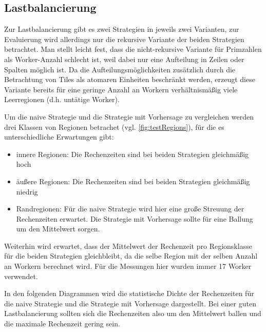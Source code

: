 \subsection{Lastbalancierung}\label{sec:lastbalancierung_eval}
Zur Lastbalancierung gibt es zwei Strategien in jeweils zwei Varianten, zur Evaluierung wird allerdings nur die rekursive Variante der beiden Strategien betrachtet.
Man stellt leicht fest, dass die nicht-rekursive Variante für Primzahlen als Worker-Anzahl schlecht ist, weil dabei nur eine Aufteilung in Zeilen oder Spalten möglich ist.
Da die Aufteilungsmöglichkeiten zusätzlich durch die Betrachtung von Tiles als atomaren Einheiten beschränkt werden, erzeugt diese Variante bereits für eine geringe Anzahl an Workern verhältnismäßig viele Leerregionen (d.h. untätige Worker).

Um die naive Strategie und die Strategie mit Vorhersage zu vergleichen werden drei Klassen von Regionen betrachet (vgl. \autoref{fig:testRegions}), für die es unterschiedliche Erwartungen gibt:

\begin{itemize}
	\item innere Regionen: Die Rechenzeiten sind bei beiden Strategien gleichmäßig hoch
	\item äußere Regionen: Die Rechenzeiten sind bei beiden Strategien gleichmäßig niedrig
	\item Randregionen: Für die naive Strategie wird hier eine große Streuung der Rechenzeiten erwartet. Die Strategie mit Vorhersage sollte für eine Ballung um den Mittelwert sorgen.
\end{itemize}

Weiterhin wird erwartet, dass der Mittelwert der Rechenzeit pro Regionsklasse für die beiden Strategien gleichbleibt, da die selbe Region mit der selben Anzahl an Workern berechnet wird.
Für die Messungen hier wurden immer 17 Worker verwendet.

In den folgenden Diagrammen wird die statistische Dichte der Rechenzeiten für die naive Strategie und die Strategie mit Vorhersage dargestellt.
Bei einer guten Lastbalancierung sollten sich die Rechenzeiten also um den Mittelwert ballen und die maximale Rechenzeit gering sein.

